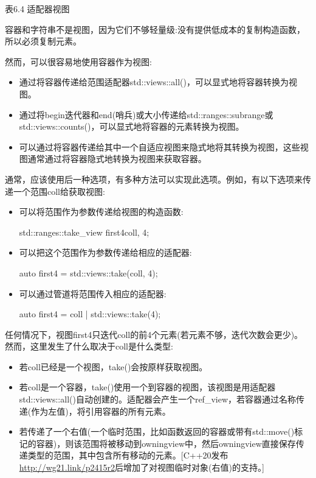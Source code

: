 \begin{center}
表6.4 适配器视图
\end{center}


容器和字符串不是视图，因为它们不够轻量级:没有提供低成本的复制构造函数，所以必须复制元素。

然而，可以很容易地使用容器作为视图:

\begin{itemize}
\item
通过将容器传递给范围适配器std::views::all()，可以显式地将容器转换为视图。

\item
通过将begin迭代器和end(哨兵)或大小传递给std::ranges::subrange或std::views::counts()，可以显式地将容器的元素转换为视图。

\item
可以通过将容器传递给其中一个自适应视图来隐式地将其转换为视图，这些视图通常通过将容器隐式地转换为视图来获取容器。
\end{itemize}

通常，应该使用后一种选项，有多种方法可以实现此选项。例如，有以下选项来传递一个范围coll给获取视图:

\begin{itemize}
\item
可以将范围作为参数传递给视图的构造函数:

\begin{cpp}
std::ranges::take_view first4{coll, 4};
\end{cpp}

\item
可以把这个范围作为参数传递给相应的适配器:

\begin{cpp}
auto first4 = std::views::take(coll, 4);
\end{cpp}

\item
可以通过管道将范围传入相应的适配器:

\begin{cpp}
auto first4 = coll | std::views::take(4);
\end{cpp}
\end{itemize}

任何情况下，视图first4只迭代coll的前4个元素(若元素不够，迭代次数会更少)。然而，这里发生了什么取决于coll是什么类型:

\begin{itemize}
\item
若coll已经是一个视图，take()会按原样获取视图。

\item
若coll是一个容器，take()使用一个到容器的视图，该视图是用适配器std::views::all()自动创建的。适配器会产生一个ref\_view，若容器通过名称传递(作为左值)，将引用容器的所有元素。

\item
若传递了一个右值(一个临时范围，比如函数返回的容器或带有std::move()标记的容器)，则该范围将被移动到owning\＿view中，然后owning\＿view直接保存传递类型的范围，其中包含所有移动的元素。[C++20发布\url{http://wg21.link/p2415r2}后增加了对视图临时对象(右值)的支持。]
\end{itemize}

